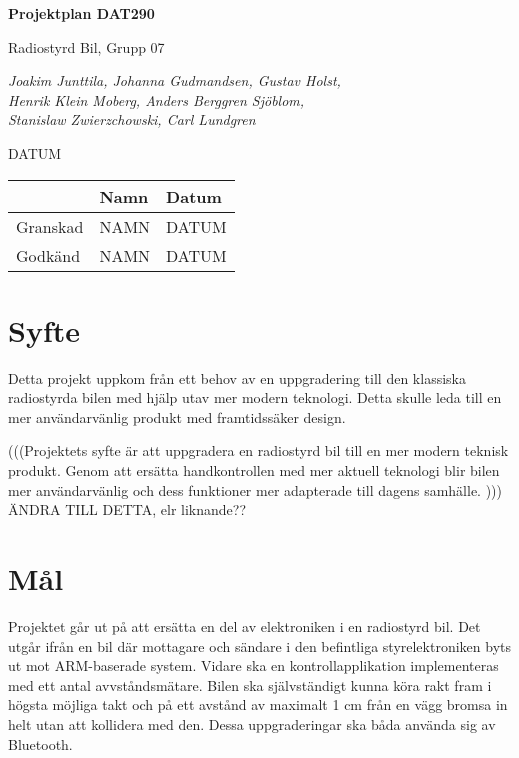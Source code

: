 \documentclass[a4paper]{article}
\begin{document}
\begin{titlepage}
\centering
{\bfseries\huge Projektplan DAT290}

\vspace{10mm}

{\Large Radiostyrd Bil, Grupp 07}

\vspace{20mm}

{\Large \itshape{Joakim Junttila, Johanna Gudmandsen, Gustav Holst,\\Henrik Klein Moberg, Anders Berggren Sjöblom, \\[1mm] Stanislaw Zwierzchowski, Carl Lundgren}}

\vspace{10mm}

{DATUM}


\normalsize{
\begin{table}[b]
\centering
\begin{tabular}{|l|l|l|}  \hline
          & \bf Namn & \bf Datum   \\ \hline \hline
 Granskad & NAMN     & DATUM        \\ \hline
 Godkänd  & NAMN     & DATUM         \\ \hline
  \end{tabular}  
  \end{table}}

\end{titlepage}
\newpage
\tableofcontents
\newpage


\section{Syfte}
Detta projekt uppkom från ett behov av en uppgradering till den klassiska radiostyrda bilen med hjälp utav mer modern teknologi. Detta skulle leda till en mer användarvänlig produkt med framtidssäker design.

\vspace{5mm}
(((Projektets syfte är att uppgradera en radiostyrd bil till en mer modern teknisk produkt. Genom att ersätta handkontrollen med mer aktuell teknologi blir bilen mer användarvänlig och dess funktioner mer adapterade till dagens samhälle. ))) ÄNDRA TILL DETTA, elr liknande??

\section{Mål}
Projektet går ut på att ersätta en del av elektroniken i en radiostyrd bil. Det utgår ifrån en bil där mottagare och sändare i den befintliga styrelektroniken byts ut mot ARM-baserade system. Vidare ska en kontrollapplikation implementeras med ett antal avvståndsmätare. Bilen ska självständigt kunna köra rakt fram i högsta möjliga takt och på ett avstånd av maximalt 1 cm från en vägg bromsa in helt utan att kollidera med den. Dessa uppgraderingar ska båda använda sig av Bluetooth. 
\end{document}
